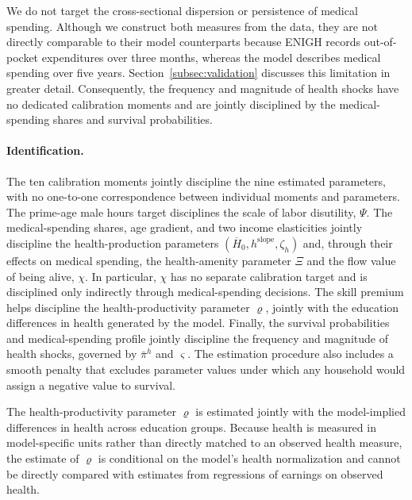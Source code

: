 \documentclass[12pt,a4paper]{article}
\begin{document}
We do not target the cross-sectional dispersion or persistence of medical spending. Although we construct both measures from the data, they are not directly comparable to their model counterparts because ENIGH records out-of-pocket expenditures over three months, whereas the model describes medical spending over five years. Section~\ref{subsec:validation} discusses this limitation in greater detail. Consequently, the frequency and magnitude of health shocks have no dedicated calibration moments and are jointly disciplined by the medical-spending shares and survival probabilities.

\paragraph{Identification.}
The ten calibration moments jointly discipline the nine estimated parameters, with no one-to-one correspondence between individual moments and parameters. The prime-age male hours target disciplines the scale of labor disutility, $\Psi$. The medical-spending shares, age gradient, and two income elasticities jointly discipline the health-production parameters $(\overline{H}_0, h^{\mathrm{slope}}, \zeta_h)$ and, through their effects on medical spending, the health-amenity parameter $\Xi$ and the flow value of being alive, $\chi$. In particular, $\chi$ has no separate calibration target and is disciplined only indirectly through medical-spending decisions. The skill premium helps discipline the health-productivity parameter $\varrho$, jointly with the education differences in health generated by the model. Finally, the survival probabilities and medical-spending profile jointly discipline the frequency and magnitude of health shocks, governed by $\bar\pi^h$ and $\varsigma$. The estimation procedure also includes a smooth penalty that excludes parameter values under which any household would assign a negative value to survival.

The health-productivity parameter $\varrho$ is estimated jointly with the model-implied differences in health across education groups. Because health is measured in model-specific units rather than directly matched to an observed health measure, the estimate of $\varrho$ is conditional on the model's health normalization and cannot be directly compared with estimates from regressions of earnings on observed health.
\end{document}
